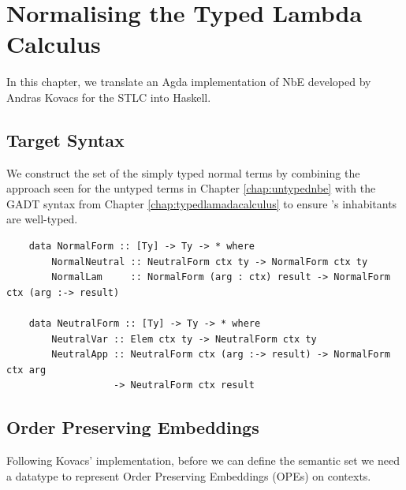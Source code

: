 \chapter{Normalising the Typed Lambda Calculus}
\label{chap:typednbe}

In this chapter, we translate an Agda implementation of NbE developed by Andras Kovacs \cite{AgdaNbe} for the STLC into Haskell.

\section{Target Syntax}


We construct the set of the simply typed normal terms  by combining the approach seen for the untyped terms in Chapter \ref{chap:untypednbe} with the GADT syntax from Chapter \ref{chap:typedlamadacalculus} to ensure 's inhabitants are well-typed.

\begin{lstlisting}
    data NormalForm :: [Ty] -> Ty -> * where
        NormalNeutral :: NeutralForm ctx ty -> NormalForm ctx ty
        NormalLam     :: NormalForm (arg : ctx) result -> NormalForm ctx (arg :-> result)    

    data NeutralForm :: [Ty] -> Ty -> * where
        NeutralVar :: Elem ctx ty -> NeutralForm ctx ty
        NeutralApp :: NeutralForm ctx (arg :-> result) -> NormalForm ctx arg 
                   -> NeutralForm ctx result

\end{lstlisting}






\section{Order Preserving Embeddings}

Following Kovacs' implementation, before we can define the semantic set we need a datatype to represent Order Preserving Embeddings (OPEs) on contexts.

